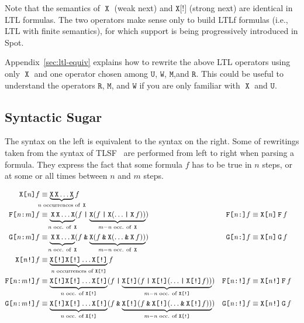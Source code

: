 \documentclass[a4paper,twoside,10pt,DIV=12]{scrreprt}
\DeclareMathOperator{\F}{\texttt{F}}
\newcommand{\FREP}[1]{\texttt{F[#1]}}
\newcommand{\StrongFREP}[1]{\texttt{F[#1!]}}
\DeclareMathOperator{\G}{\texttt{G}}
\newcommand{\GREP}[1]{\texttt{G[#1]}}
\newcommand{\StrongGREP}[1]{\texttt{G[#1!]}}
\newcommand{\U}{\mathbin{\texttt{U}}}
\newcommand{\R}{\mathbin{\texttt{R}}}
\DeclareMathOperator{\X}{\texttt{X}}
\newcommand{\StrongX}{\texttt{X[!]}}
\newcommand{\XREP}[1]{\texttt{X[#1]}}
\newcommand{\StrongXREP}[1]{\texttt{X[#1!]}}
\newcommand{\M}{\mathbin{\texttt{M}}}
\newcommand{\W}{\mathbin{\texttt{W}}}
\newcommand{\OR}{\mathbin{\texttt{|}}}
\newcommand{\AND}{\mathbin{\texttt{\&}}}
\newcommand{\0}{\texttt{0}}
\newcommand{\1}{\texttt{1}}
\def\clap#1{\hbox to 0pt{\hss#1\hss}}
\def\mathclap{\mathpalette\mathclapinternal}
\def\mathclapinternal#1#2{%
           \clap{$\mathsurround=0pt#1{#2}$}}
\newcommand\mvar[1]{\ensuremath{\mathit{#1}}}
\begin{document}
Note that the semantics of $\X$ (weak next) and $\StrongX$ (strong
next) are identical in LTL formulas.  The two operators make sense
only to build LTLf formulas (i.e., LTL with finite semantics), for
which support is being progressively introduced in Spot.

Appendix~\ref{sec:ltl-equiv} explains how to rewrite the above LTL
operators using only $\X$ and one operator chosen among $\U$, $\W$,
$\M$,and $\R$.  This could be useful to understand the operators $\R$,
$\M$, and $\W$ if you are only familiar with $\X$ and $\U$.

\subsection{Syntactic Sugar}

The syntax on the left is equivalent to the syntax on the right.
Some of rewritings taken from the syntax of TLSF~\citep{jacobs.16.synt}
are performed from left to right when parsing a formula.  They express
the fact that some formula $f$ has to be true in $n$ steps, or at some
or all times between $n$ and $m$ steps.

\begin{align*}
  \XREP{\mvar{n}} f
  & \equiv \underbrace{\X\X\ldots\X}_{\mathclap{\text{\mvar{n} occurrences of~}\X}} f \\
  \FREP{\mvar{n}:\mvar{m}}f
  & \equiv \underbrace{\vphantom{(}\X\X\ldots\X}_{\mathclap{\text{\mvar{n} occ. of~}\X}} (f \OR \underbrace{\X(f \OR \X(\ldots \OR \X f))}_{\mathclap{\mvar{m}-\mvar{n}\text{~occ. of~}\X}})
  & \FREP{\mvar{n}:}f &\equiv \XREP{\mvar{n}}\F{}f\\
  \GREP{\mvar{n}:\mvar{m}}f
  & \equiv \underbrace{\vphantom{(}\X\X\ldots\X}_{\mathclap{\text{\mvar{n} occ. of~}\X}} (f \AND \underbrace{\X(f \AND \X(\ldots \AND \X f))}_{\mathclap{\mvar{m}-\mvar{n}\text{~occ. of~}\X}})
  & \GREP{\mvar{n}:}f &\equiv \XREP{\mvar{n}}\G{}f\\
 \StrongXREP{\mvar{n}} f
 & \equiv \underbrace{\StrongX\StrongX\ldots\StrongX}_{\mathclap{\text{\mvar{n} occurrences of~}\StrongX}} f \\
 \StrongFREP{\mvar{n}:\mvar{m}}f
 & \equiv \underbrace{\vphantom{(}\StrongX\StrongX\ldots\StrongX}_{\mathclap{\text{\mvar{n} occ. of~}\StrongX}} (f \OR \underbrace{\StrongX(f \OR \StrongX(\ldots \OR \StrongX f))}_{\mathclap{\mvar{m}-\mvar{n}\text{~occ. of~}\StrongX}})
 & \StrongFREP{\mvar{n}:}f &\equiv \StrongXREP{\mvar{n}}\F{}f\\
 \StrongGREP{\mvar{n}:\mvar{m}}f
 & \equiv \underbrace{\vphantom{(}\StrongX\StrongX\ldots\StrongX}_{\mathclap{\text{\mvar{n} occ. of~}\StrongX}} (f \AND \underbrace{\StrongX(f \AND \StrongX(\ldots \AND \StrongX f))}_{\mathclap{\mvar{m}-\mvar{n}\text{~occ. of~}\StrongX}})
 & \StrongGREP{\mvar{n}:}f &\equiv \StrongXREP{\mvar{n}}\G{}f
\end{align*}
\end{document}

